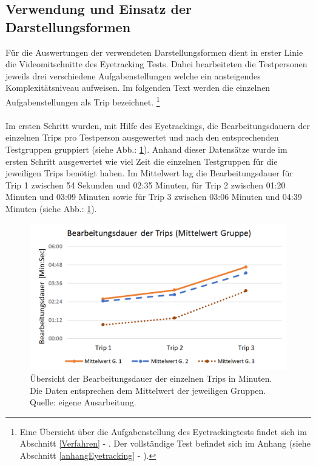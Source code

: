 \documentclass[Bachelorarbeit.tex]{subfiles}
\begin{document}
\subsection{Verwendung und Einsatz der Darstellungsformen}
\label{ergebnis_darstellungsformen}
Für die Auswertungen der verwendeten Darstellungsformen dient in erster Linie die Videomitschnitte des Eyetracking Tests. 
Dabei bearbeiteten die Testpersonen jeweils drei verschiedene Aufgabenstellungen welche ein ansteigendes Komplexitätsniveau aufweisen.
Im folgenden Text werden die einzelnen Aufgabenstellungen als Trip bezeichnet.
\footnote{Eine Übersicht über die Aufgabenstellung des Eyetrackingtests findet sich im Abschnitt \ref{Verfahren} - . Der vollständige Test befindet sich im Anhang (siehe Abschnitt \ref{anhangEyetracking} - ). 
	}\\
	\\
Im ersten Schritt wurden, mit Hilfe des Eyetrackings, die Bearbeitungsdauern der einzelnen Trips pro Testperson ausgewertet und nach den entsprechenden Testgruppen gruppiert (siehe Abb.: \ref{fig:BearbeitungsdauerTrip}).  
Anhand dieser Datensätze wurde im ersten Schritt ausgewertet wie viel Zeit die einzelnen Testgruppen für die jeweiligen Trips benötigt haben.
Im Mittelwert lag die Bearbeitungsdauer für Trip 1 zwischen 54 Sekunden und 02:35 Minuten, für Trip 2 zwischen 01:20 Minuten und 03:09 Minuten sowie für Trip 3 zwischen 03:06 Minuten und 04:39 Minuten (siehe Abb.: \ref{fig:BearbeitungsdauerTrip}).
\begin{figure}[H]
\centering
\includegraphics[width=0.7\linewidth]{img/Evaluation/Darstellungsformen/BearbeitungsdauerTrip}
\caption[Übersicht der Bearbeitungsdauer]{Übersicht der Bearbeitungsdauer der einzelnen Trips in Minuten. Die Daten entsprechen dem Mittelwert der jeweiligen Gruppen.  
Quelle: eigene Ausarbeitung.
	}
\label{fig:BearbeitungsdauerTrip}
\end{figure}
\end{document}
